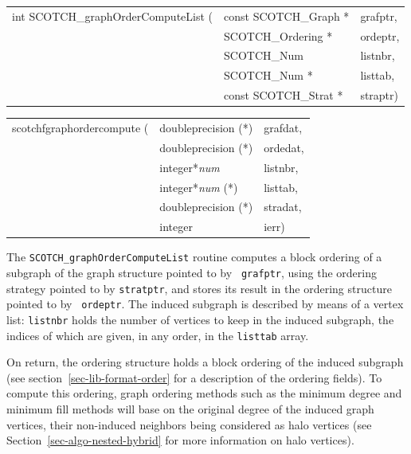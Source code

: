 \begin{itemize}
\progsyn

{\tt\begin{tabular}{l@{}ll}
int SCOTCH\_graphOrderComputeList ( & const SCOTCH\_Graph * & grafptr, \\
                                    & SCOTCH\_Ordering *    & ordeptr, \\
                                    & SCOTCH\_Num           & listnbr, \\
                                    & SCOTCH\_Num *         & listtab, \\
                                    & const SCOTCH\_Strat * & straptr)
\end{tabular}}

{\tt\begin{tabular}{l@{}ll}
scotchfgraphordercompute ( & doubleprecision (*)   & grafdat, \\
                           & doubleprecision (*)   & ordedat, \\
                           & integer*{\it num}     & listnbr, \\
                           & integer*{\it num} (*) & listtab, \\
                           & doubleprecision (*)   & stradat, \\
                           & integer               & ierr)
\end{tabular}}

\progdes

The {\tt SCOTCH\_graphOrderComputeList} routine computes a block
ordering of a subgraph of the graph structure pointed to by {\tt
grafptr}, using the ordering strategy pointed to by {\tt stratptr},
and stores its result in the ordering structure pointed to by {\tt
ordeptr}. The induced subgraph is described by means of a vertex
list: {\tt listnbr} holds the number of vertices to keep in the
induced subgraph, the indices of which are given, in any order,
in the {\tt listtab} array.

On return, the ordering structure holds a block ordering of the
induced subgraph (see section~\ref{sec-lib-format-order} for a
description of the ordering fields). To compute this ordering, graph
ordering methods such as the minimum degree and minimum fill methods
will base on the original degree of the induced graph vertices, their
non-induced neighbors being considered as halo vertices (see
Section~\ref{sec-algo-nested-hybrid} for more information on halo
vertices).


\end{itemize}
